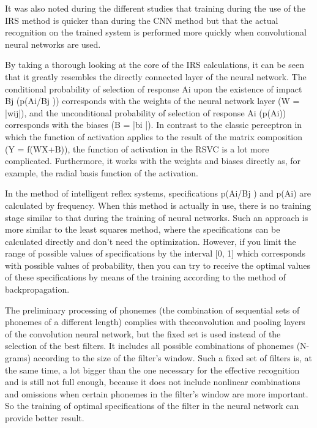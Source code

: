 It was also noted during the different studies that training during the use of the IRS method is quicker than during the CNN method but that the actual recognition on the trained system is performed more quickly when convolutional neural networks are used. 

By taking a thorough looking at the core of the IRS calculations, it can be seen that it greatly resembles the directly connected layer of the neural network. The conditional probability of selection of response Ai upon the existence of impact Bj (p(Ai/Bj )) corresponds with the weights of the neural network layer (W = |wij|), and the unconditional probability of selection of response Ai (p(Ai)) corresponds with the biases (B = |bi |). In contrast to the classic perceptron in which the function of activation applies to the result of the matrix composition (Y = f(WX+B)), the function of activation in the RSVC is a lot more complicated. Furthermore, it works with the weights and biases directly as, for example, the radial basis function of the activation. 

In the method of intelligent reflex systems, specifications p(Ai/Bj ) and p(Ai) are calculated by frequency. When this method is actually in use, there is no training stage similar to that during the training of neural networks. Such an approach is more similar to the least squares method, where the specifications can be calculated directly and don’t need the optimization. 
However, if you limit the range of possible values of specifications by the interval [0, 1] which corresponds with possible values of probability, then you can try to receive the optimal values of these specifications by means of the training according to the method of backpropagation. 

The preliminary processing of phonemes (the combination of sequential sets of phonemes of a different length) complies with theconvolution and pooling layers of the convolution neural network, but the fixed set is used instead of the selection of the best filters. It includes all possible combinations of phonemes (N-grams) according to the size of the filter’s window. Such a fixed set of filters is, at the same time, a lot bigger than the one necessary for the effective recognition and is still not full enough, because it does not include nonlinear combinations and omissions when certain phonemes in the filter’s window are more important. So the training of optimal specifications of the filter in the neural network can provide better result. 

